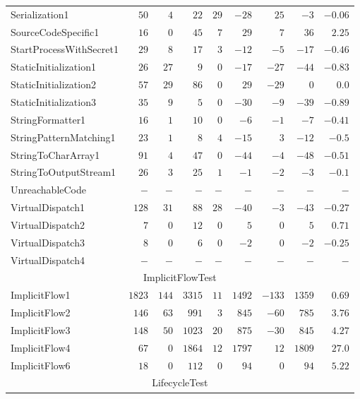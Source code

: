 \documentclass[../draft.tex]{subfiles}
\newcommand{\tsubEight}[1]{\multicolumn{9}{c}{#1}\\\hline}
\begin{document}
\begin{longtable}{l | r | r | r | r | r | r | r | r}
        Serialization1 & $50$ & $4$ & $22$ & $29$ & $-28$ & $25$ & $-3$ & $-0.06$\\
        SourceCodeSpecific1 & $16$ & $0$ & $45$ & $7$ & $29$ & $7$ & $36$ & $2.25$\\
        StartProcessWithSecret1 & $29$ & $8$ & $17$ & $3$ & $-12$ & $-5$ & $-17$ & $-0.46$\\
        StaticInitialization1 & $26$ & $27$ & $9$ & $0$ & $-17$ & $-27$ & $-44$ & $-0.83$\\
        StaticInitialization2 & $57$ & $29$ & $86$ & $0$ & $29$ & $-29$ & $0$ & $0.0$\\
        StaticInitialization3 & $35$ & $9$ & $5$ & $0$ & $-30$ & $-9$ & $-39$ & $-0.89$\\
        StringFormatter1 & $16$ & $1$ & $10$ & $0$ & $-6$ & $-1$ & $-7$ & $-0.41$\\
        StringPatternMatching1 & $23$ & $1$ & $8$ & $4$ & $-15$ & $3$ & $-12$ & $-0.5$\\
        StringToCharArray1 & $91$ & $4$ & $47$ & $0$ & $-44$ & $-4$ & $-48$ & $-0.51$\\
        StringToOutputStream1 & $26$ & $3$ & $25$ & $1$ & $-1$ & $-2$ & $-3$ & $-0.1$\\
        UnreachableCode & $-$ & $-$ & $-$ & $-$ & $-$ & $-$ & $-$ & $-$\\
        VirtualDispatch1 & $128$ & $31$ & $88$ & $28$ & $-40$ & $-3$ & $-43$ & $-0.27$\\
        VirtualDispatch2 & $7$ & $0$ & $12$ & $0$ & $5$ & $0$ & $5$ & $0.71$\\
        VirtualDispatch3 & $8$ & $0$ & $6$ & $0$ & $-2$ & $0$ & $-2$ & $-0.25$\\
        VirtualDispatch4 & $-$ & $-$ & $-$ & $-$ & $-$ & $-$ & $-$ & $-$\\
        \hline
        \tsubEight{ImplicitFlowTest}
        ImplicitFlow1 & $1823$ & $144$ & $3315$ & $11$ & $1492$ & $-133$ & $1359$ & $0.69$\\
        ImplicitFlow2 & $146$ & $63$ & $991$ & $3$ & $845$ & $-60$ & $785$ & $3.76$\\
        ImplicitFlow3 & $148$ & $50$ & $1023$ & $20$ & $875$ & $-30$ & $845$ & $4.27$\\
        ImplicitFlow4 & $67$ & $0$ & $1864$ & $12$ & $1797$ & $12$ & $1809$ & $27.0$\\
        ImplicitFlow6 & $18$ & $0$ & $112$ & $0$ & $94$ & $0$ & $94$ & $5.22$\\
        \hline
        \tsubEight{LifecycleTest}

\end{longtable}
\end{document}
